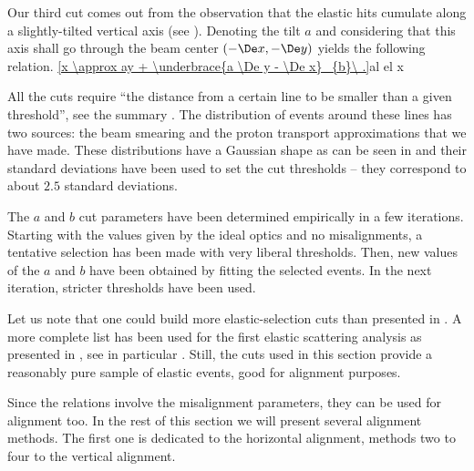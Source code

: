 Our third cut comes out from the observation that the elastic hits cumulate along a slightly-tilted vertical axis (see ). Denoting the tilt $a$ and considering that this axis shall go through the beam center $(-\De x, -\De y)$ yields the following relation.
\eqref{x \approx ay + \underbrace{a \De y - \De x}_{b}\ .}{al el x} 

All the cuts  require ``the distance from a certain line to be smaller than a given threshold'', see the summary . The distribution of events around these lines has two sources: the beam smearing and the proton transport approximations that we have made. These distributions have a Gaussian shape as can be seen in  and their standard deviations have been used to set the cut thresholds -- they correspond to about $2.5$ standard deviations.



The $a$ and $b$ cut parameters have been determined empirically in a few iterations. Starting with the values given by the ideal optics and no misalignments, a tentative selection has been made with very liberal thresholds. Then, new values of the $a$ and $b$ have been obtained by fitting the selected events. In the next iteration, stricter thresholds have been used.

Let us note that one could build more elastic-selection cuts than presented in . A more complete list has been used for the first elastic scattering analysis as presented in , see in particular . Still, the cuts used in this section provide a reasonably pure sample of elastic events, good for alignment purposes.

Since the relations  involve the misalignment parameters, they can be used for alignment too. In the rest of this section we will present several alignment methods. The first one is dedicated to the horizontal alignment, methods two to four to the vertical alignment.

